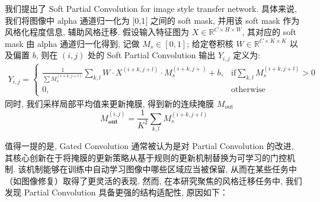 我们提出了 Soft Partial Convolution for image style transfer network. 具体来说, 我们将图像中 alpha 通道归一化为 $[$0,1$]$ 之间的 soft mask, 并用该 soft mask 作为风格化程度信息, 辅助风格迁移. 假设输入特征图为 $X \in \mathbb{R}^{C\times H \times W}$, 其对应的 soft mask 由 alpha 通道归一化得到, 记做 $M_{s}\in [\mathrm{0},\mathrm{1}]$; 给定卷积核 $W \in \mathbb{R}^{C\times K \times K}$ 以及偏置 $b$, 则在 $(i,j)$ 处的 Soft Partial Convolution 输出 $Y_{i,j}$ 定义为:
\begin{equation}
    \begin{aligned}
        \label{equation-soft_partial_convolution}
        Y_{i,j} = \begin{cases}
            \frac{1}{\sum M_s^{(i+k,j+l)}} \sum_{k,l} W \cdot X^{(i+k, j+l)} \cdot M_{s}^{(i+k, j+)} + b,& \mathrm{if} \sum_{k,l} M_{s}^{(i+k, j+l)} > 0 \\
            0, & \mathrm{otherwise}
        \end{cases}
    \end{aligned}
\end{equation}
同时, 我们采样局部平均值来更新掩膜, 得到新的连续掩膜 $M_{\mathrm{out}}$
\begin{equation}
    \label{equation-mask_update}
    M_{\mathbf{out}}^{(i,j)} = \frac{1}{K^2}\sum_{k,l} M_{s}^{(i+k, j+l)} 
\end{equation}

值得一提的是, Gated Convolution\cite{yu2019free} 通常被认为是对 Partial Convolution 的改进, 其核心创新在于将掩膜的更新策略从基于规则的更新机制替换为可学习的门控机制. 该机制能够在训练中自动学习图像中哪些区域应当被保留, 从而在某些任务中（如图像修复）取得了更灵活的表现. 然而, 在本研究聚焦的风格迁移任务中, 我们发现 Partial Convolution 具备更强的结构适配性, 原因如下：
